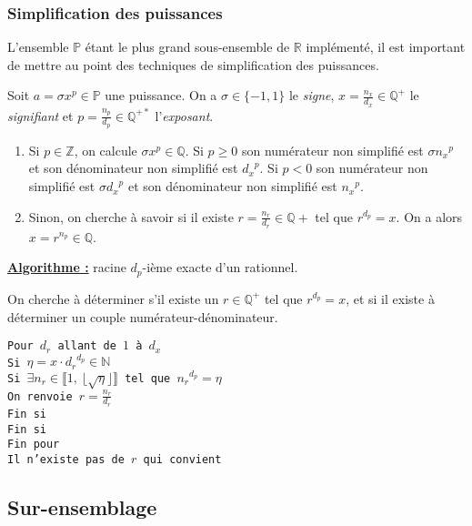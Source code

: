 \documentclass[french]{article}
\newcommand{\tab}{\hspace*{5mm}}
\newcommand{\floor}[1]{\lfloor #1 \rfloor} %
\newcommand{\entiers}[2]{\llbracket #1,\ #2\rrbracket} %
\begin{document}
\subsubsection{Simplification des puissances}

L'ensemble $\mathbb{P}$ étant le plus grand sous-ensemble de $\mathbb{R}$ implémenté, il est important de mettre au point des techniques de simplification des puissances.

Soit $a = \sigma x ^ p \in \mathbb{P}$ une puissance. On a $\sigma \in \{-1, 1\}$ le \textit{signe}, $x = \frac{n_x}{d_x} \in \mathbb{Q}^+$ le \textit{signifiant} et $p = \frac{n_p}{d_p} \in \mathbb{Q}^{+*}$ l'\textit{exposant}.

\begin{enumerate}
  \item Si $p \in \mathbb{Z}$, on calcule $\sigma x ^ p \in \mathbb{Q}$. Si $p \ge 0$ son numérateur non simplifié est $\sigma {n_x}^p$ et son dénominateur non simplifié est ${d_x}^p$. Si $p < 0$ son numérateur non simplifié est $\sigma {d_x}^p$ et son dénominateur non simplifié est ${n_x}^p$.
  \item Sinon, on cherche à savoir si il existe $r = \frac{n_r}{d_r} \in \mathbb{Q}+$ tel que $r^{d_p} = x$. On a alors $x = r^{n_p} \in \mathbb{Q}$.
\end{enumerate}

\noindent \textbf{\underline{Algorithme :}} racine $d_p$-ième exacte d'un rationnel.

\noindent On cherche à déterminer s'il existe un $r \in \mathbb{Q}^+$ tel que $r^{d_p} = x$, et si il existe à déterminer un couple numérateur-dénominateur.

\noindent\texttt{Pour $d_r$ allant de $1$ à $d_x$ \\
\tab Si $\eta = x \cdot {d_r}^{d_p} \in \mathbb{N}$ \\
\tab\tab Si $\exists n_r \in \entiers{1}{\floor{\sqrt{\eta}}}$ tel que ${n_r}^{d_p} = \eta$ \\
\tab\tab\tab On renvoie $r = \frac{n_r}{d_r}$ \\
\tab\tab Fin si \\
\tab Fin si \\
Fin pour\\
Il n'existe pas de $r$ qui convient}


\subsection{Sur-ensemblage}
\end{document}
